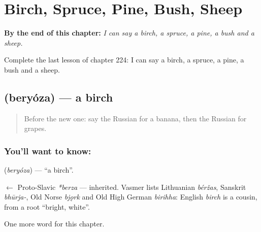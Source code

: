 
\chapter{Birch, Spruce, Pine, Bush, Sheep}
\label{ch:ru-birch-spruce-pine-bush-sheep}

\begin{chapteropening}
\textbf{By the end of this chapter:} \emph{I can say a birch, a spruce, a pine, a bush and a sheep.}

Complete the last lesson of chapter 224: I can say a birch, a spruce, a pine, a bush and a sheep.
\end{chapteropening}

\section[\texorpdfstring{\ru{берёза} (beryóza)}{берёза (beryóza)}]{ (beryóza) — a birch}

\label{lesson:RU-C224-beryoza}



\begin{quote}
Before the new one: say the Russian for a banana, then the Russian for grapes.
\end{quote}

\subsection*{You'll want to know: }
\textbf{} (\emph{beryóza}) — \textquotedblleft{}a birch\textquotedblright{}.

\begin{cousinweb}
\textbf{} $\leftarrow$ Proto-Slavic \emph{*berza} — inherited. Vasmer lists Lithuanian \emph{béržas}, Sanskrit \emph{bhūrja-}, Old Norse \emph{bjǫrk} and Old High German \emph{birihha}: English \emph{birch} is a cousin, from a root \textquotedblleft{}bright, white\textquotedblright{}.
\end{cousinweb}

\begin{grammarlens}[title={What you've built}]
One more word for this chapter.
\end{grammarlens}

